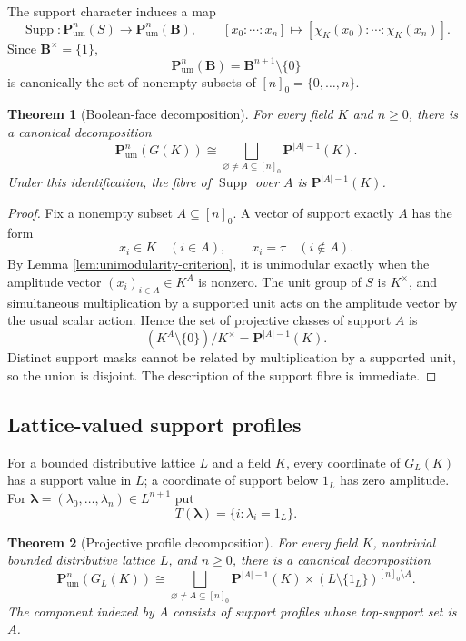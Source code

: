 \documentclass[11pt]{amsart}
\numberwithin{equation}{section}
\newtheorem{theorem}{Theorem}[section]
\theoremstyle{definition}
\newcommand{\B}{\mathbf B}
\newcommand{\Supp}{\operatorname{Supp}}
\newcommand{\Pum}{\mathbf P_{\mathrm{um}}}
\begin{document}
The support character induces a map
\[
\Supp:\Pum^n(S)\longrightarrow\Pum^n(\B),
\qquad
[x_0:\cdots:x_n]
\longmapsto
[\chi_K(x_0):\cdots:\chi_K(x_n)].
\]
Since $\B^\times=\{1\}$,
\[
\Pum^n(\B)=\B^{n+1}\setminus\{0\}
\]
is canonically the set of nonempty subsets of $[n]_0=\{0,\dots,n\}$.

\begin{theorem}[Boolean-face decomposition]\label{thm:projective-face-decomposition}
For every field $K$ and $n\ge0$, there is a canonical decomposition
\[
\boxed{
\Pum^n(G(K))
\cong
\bigsqcup_{\varnothing\neq A\subseteq[n]_0}
\mathbf P^{|A|-1}(K).}
\]
Under this identification, the fibre of $\Supp$ over $A$ is $\mathbf P^{|A|-1}(K)$.
\end{theorem}

\begin{proof}
Fix a nonempty subset $A\subseteq[n]_0$.  A vector of support exactly $A$ has the form
\[
x_i\in K\quad(i\in A),
\qquad
x_i=\tau\quad(i\notin A).
\]
By Lemma \ref{lem:unimodularity-criterion}, it is unimodular exactly when the amplitude vector $(x_i)_{i\in A}\in K^A$ is nonzero.  The unit group of $S$ is $K^\times$, and simultaneous multiplication by a supported unit acts on the amplitude vector by the usual scalar action.  Hence the set of projective classes of support $A$ is
\[
(K^A\setminus\{0\})/K^\times
=\mathbf P^{|A|-1}(K).
\]
Distinct support masks cannot be related by multiplication by a supported unit, so the union is disjoint.  The description of the support fibre is immediate.
\end{proof}


\subsection{Lattice-valued support profiles}

For a bounded distributive lattice $L$ and a field $K$, every coordinate of
$G_L(K)$ has a support value in $L$; a coordinate of support below $1_L$
has zero amplitude.  For
$\boldsymbol\lambda=(\lambda_0,\dots,\lambda_n)\in L^{n+1}$ put
\[
T(\boldsymbol\lambda)=\{i:\lambda_i=1_L\}.
\]

\begin{theorem}[Projective profile decomposition]
\label{thm:lattice-projective-profile}
For every field $K$, nontrivial bounded distributive lattice $L$, and
$n\ge0$, there is a canonical decomposition
\[
\boxed{
\Pum^n(G_L(K))
\cong
\bigsqcup_{\varnothing\neq A\subseteq[n]_0}
\mathbf P^{|A|-1}(K)\times
(L\setminus\{1_L\})^{[n]_0\setminus A}.
}
\]
The component indexed by $A$ consists of support profiles whose top-support
set is $A$.
\end{theorem}
\end{document}
